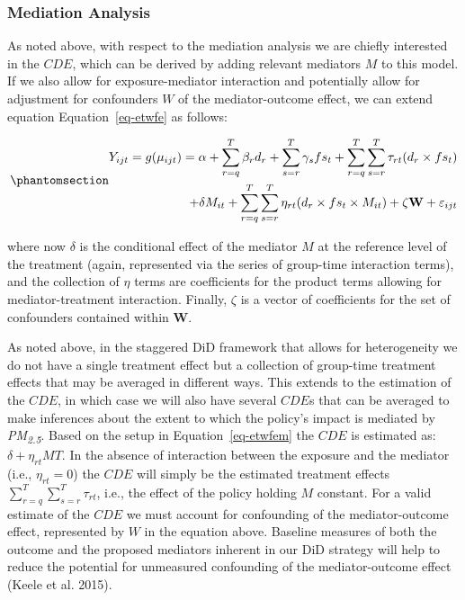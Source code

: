 \documentclass[
  letterpaper,
  DIV=11,
  numbers=noendperiod]{scrartcl}
\begin{document}
\subsubsection{Mediation Analysis}\label{mediation-analysis}

As noted above, with respect to the mediation analysis we are chiefly
interested in the \(CDE\), which can be derived by adding relevant
mediators \(M\) to this model. If we also allow for exposure-mediator
interaction and potentially allow for adjustment for confounders \(W\)
of the mediator-outcome effect, we can extend equation
Equation~\ref{eq-etwfe} as follows:

\begin{equation}\phantomsection\label{eq-etwfem}{
\begin{aligned}
Y_{ijt}=g(\mu_{ijt}) = \alpha + \sum_{r=q}^{T} \beta_{r} d_{r} + \sum_{s=r}^{T} \gamma_{s} fs_{t}+ \sum_{r=q}^{T} \sum_{s=r}^{T} \tau_{rt} (d_{r} \times fs_{t}) \\ + \delta M_{it} + \sum_{r=q}^{T} \sum_{s=r}^{T} \eta_{rt} (d_{r} \times fs_{t} \times M_{it}) + \zeta \mathbf{W} + \varepsilon_{ijt}
\end{aligned}
}\end{equation}

where now \(\delta\) is the conditional effect of the mediator \(M\) at
the reference level of the treatment (again, represented via the series
of group-time interaction terms), and the collection of \(\eta\) terms
are coefficients for the product terms allowing for mediator-treatment
interaction. Finally, \(\zeta\) is a vector of coefficients for the set
of confounders contained within \(\mathbf{W}\).

As noted above, in the staggered DiD framework that allows for
heterogeneity we do not have a single treatment effect but a collection
of group-time treatment effects that may be averaged in different ways.
This extends to the estimation of the \(CDE\), in which case we will
also have several \(CDE\)s that can be averaged to make inferences about
the extent to which the policy's impact is mediated by
\emph{PM\textsubscript{2.5}}. Based on the setup in
Equation~\ref{eq-etwfem} the \(CDE\) is estimated as:
\(\delta + \eta_{rt}MT\). In the absence of interaction between the
exposure and the mediator (i.e., \(\eta_{rt}=0\)) the \(CDE\) will
simply be the estimated treatment effects
\(\sum_{r=q}^{T} \sum_{s=r}^{T} \tau_{rt}\), i.e., the effect of the
policy holding \(M\) constant. For a valid estimate of the \(CDE\) we
must account for confounding of the mediator-outcome effect, represented
by \(W\) in the equation above. Baseline measures of both the outcome
and the proposed mediators inherent in our DiD strategy will help to
reduce the potential for unmeasured confounding of the mediator-outcome
effect (Keele et al. 2015).
\end{document}
